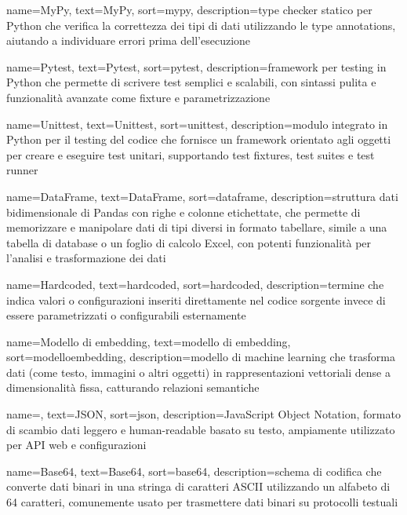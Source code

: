  {
    name=MyPy,
    text=MyPy,
    sort=mypy,
    description={type checker statico per Python che verifica la correttezza dei tipi di dati utilizzando le type annotations, aiutando a individuare errori prima dell'esecuzione}
}

 {
    name=Pytest,
    text=Pytest,
    sort=pytest,
    description={framework per testing in Python che permette di scrivere test semplici e scalabili, con sintassi pulita e funzionalità avanzate come fixture e parametrizzazione}
}

 {
    name=Unittest,
    text=Unittest,
    sort=unittest,
    description={modulo integrato in Python per il testing del codice che fornisce un framework orientato agli oggetti per creare e eseguire test unitari, supportando test fixtures, test suites e test runner}
}

 {
    name=DataFrame,
    text=DataFrame,
    sort=dataframe,
    description={struttura dati bidimensionale di Pandas con righe e colonne etichettate, che permette di memorizzare e manipolare dati di tipi diversi in formato tabellare, simile a una tabella di database o un foglio di calcolo Excel, con potenti funzionalità per l'analisi e trasformazione dei dati}
}

 {
    name=Hardcoded,
    text=hardcoded,
    sort=hardcoded,
    description={termine che indica valori o configurazioni inseriti direttamente nel codice sorgente invece di essere parametrizzati o configurabili esternamente}
}

 {
    name=Modello di embedding,
    text=modello di embedding,
    sort=modelloembedding,
    description={modello di machine learning che trasforma dati (come testo, immagini o altri oggetti) in rappresentazioni vettoriali dense a dimensionalità fissa, catturando relazioni semantiche}
}

 {
    name=,
    text=JSON,
    sort=json,
    description={JavaScript Object Notation, formato di scambio dati leggero e human-readable basato su testo, ampiamente utilizzato per API web e configurazioni}
}

 {
    name=Base64,
    text=Base64,
    sort=base64,
    description={schema di codifica che converte dati binari in una stringa di caratteri ASCII utilizzando un alfabeto di 64 caratteri, comunemente usato per trasmettere dati binari su protocolli testuali}
}

